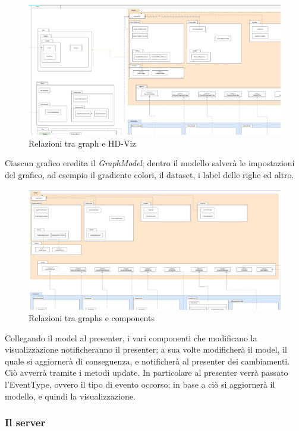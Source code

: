 \documentclass[../manuale_sviluppatore.tex]{subfiles}
\begin{document}
\begin{figure}[H]
	\centering
	\includegraphics[width=18cm]{img/graph-e-hdviz.jpg}
	\caption{Relazioni tra graph e HD-Viz}
\end{figure}


Ciascun grafico eredita il \emph{GraphModel}; dentro il modello salverà le impostazioni del grafico, ad esempio il gradiente colori, il dataset, i label delle righe ed altro.

\begin{figure}[H]
	\centering
	\includegraphics[width=18cm]{img/graphs-e-components.jpg}
	\caption{Relazioni tra graphs e components}
\end{figure}


Collegando il model al presenter, i vari componenti che modificano la visualizzazione notificheranno il presenter; a sua volte modificherà il model, il quale si aggiornerà di conseguenza, 
e notificherà al presenter dei cambiamenti.
Ciò avverrà tramite i metodi update. In particolare al presenter verrà passato l'EventType, ovvero il tipo di evento occorso; in base a ciò si aggiornerà il modello, e quindi la visualizzazione.

\subsubsection{Il server}
\end{document}

